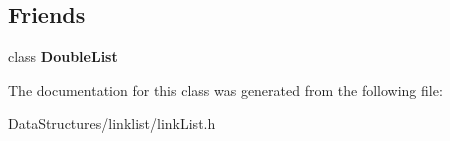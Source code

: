\subsection*{Friends}
\begin{DoxyCompactItemize}
\item 
\mbox{\label{classDoubleList_1_1Iterator_a2a5fbd3715b55cada5f43daece7050ab}} 
class {\bfseries Double\+List}
\end{DoxyCompactItemize}


The documentation for this class was generated from the following file\+:\begin{DoxyCompactItemize}
\item 
Data\+Structures/linklist/link\+List.\+h\end{DoxyCompactItemize}

